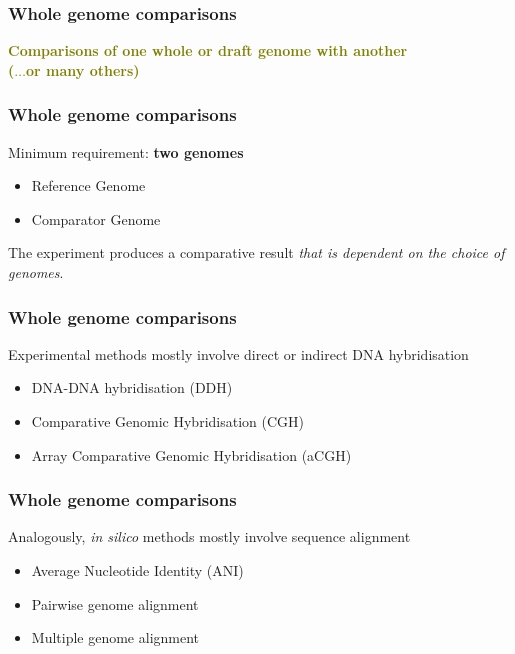 
%
\begin{frame}
  \frametitle{Whole genome comparisons}
  \Large{
    \textcolor{olive}{
      \textbf{
      Comparisons of one whole or draft genome with another \\
      ($\ldots$or many others)
      }
    }
  }
\end{frame}

%
\begin{frame}
  \frametitle{Whole genome comparisons}
  Minimum requirement: \textbf{two genomes} \\
  \begin{itemize}
    \item \textcolor{hutton_green}{Reference Genome}
    \item \textcolor{hutton_blue}{Comparator Genome}
  \end{itemize}
  The experiment produces a comparative result \textcolor{hutton_purple}{\textit{that is dependent on the choice of genomes}}.
\end{frame}

%
\begin{frame}
  \frametitle{Whole genome comparisons}
  Experimental methods mostly involve direct or indirect DNA hybridisation \\
  \begin{itemize}
    \item \textcolor{hutton_green}{DNA-DNA hybridisation (DDH)}
    \item \textcolor{hutton_blue}{Comparative Genomic Hybridisation (CGH)}
    \item \textcolor{hutton_purple}{Array Comparative Genomic Hybridisation (aCGH)}    
  \end{itemize}
\end{frame}

%
\begin{frame}
  \frametitle{Whole genome comparisons}
  Analogously, \textit{in silico} methods mostly involve sequence alignment \\
  \begin{itemize}
    \item \textcolor{hutton_green}{Average Nucleotide Identity (ANI)}
    \item \textcolor{hutton_blue}{Pairwise genome alignment}
    \item \textcolor{hutton_purple}{Multiple genome alignment}    
  \end{itemize}
\end{frame}

